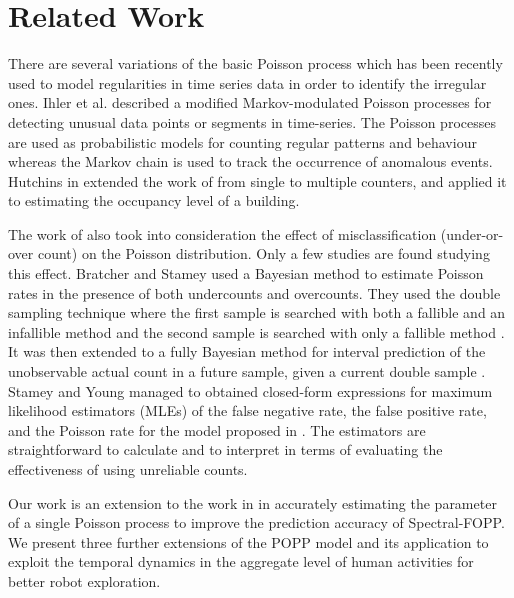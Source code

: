 \section{Related Work}
\label{sec:related}

There are several variations of the basic Poisson process which has been recently used to model regularities in time series data in order to identify the irregular ones. Ihler et al. \cite{Ihler2006adaptive, Ihler2007detecting} described a modified Markov-modulated Poisson processes for detecting unusual data points or segments in time-series. The Poisson processes are used as probabilistic models for counting regular patterns and behaviour whereas the Markov chain is used to track the occurrence of anomalous events. Hutchins in \cite{hutchins2007countdata} extended the work of \cite{Ihler2006adaptive} from single to multiple counters, and applied it to estimating the occupancy level of a building. 

The work of \cite{hutchins2007countdata} also took into consideration the effect of misclassification (under-or-over count) on the Poisson distribution. Only a few studies are found studying this effect. Bratcher and Stamey used a Bayesian method to estimate Poisson rates in the presence of both undercounts and overcounts. They used the double sampling technique where the first sample is searched with both a fallible and an infallible method and the second sample is searched with only a fallible method \cite{bratcher2002}. It was then extended to a fully Bayesian method for interval prediction of the unobservable actual count in a future sample, given a current double sample \cite{bratcher2004}. Stamey and Young \cite{stamey2005} managed to obtained closed-form expressions for maximum likelihood estimators (MLEs) of the false negative rate, the false positive rate, and the Poisson rate for the model proposed in \cite{bratcher2002}. The estimators are straightforward to calculate and to interpret in terms of evaluating the effectiveness of using unreliable counts.


Our work is an extension to the work in \cite{jovan18a} in accurately estimating the parameter of a single Poisson process to improve the prediction accuracy of Spectral-FOPP. We present three further extensions of the POPP model and its application to exploit the temporal dynamics in the aggregate level of human activities for better robot exploration.
